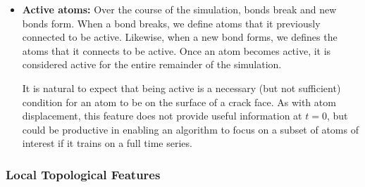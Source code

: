 \begin{itemize}
    \item \textbf{Active atoms:} Over the course of the simulation, bonds break and new bonds form.  When a bond breaks, we define atoms that it previously connected to be active.  Likewise, when a new bond forms, we defines the atoms that it connects to be active.  Once an atom becomes active, it is considered active for the entire remainder of the simulation.
    
    It is natural to expect that being active is a necessary (but not sufficient) condition for an atom to be on the surface of a crack face.  As with atom displacement, this feature does not provide useful information at $t=0$, but could be productive in enabling an algorithm to focus on a subset of atoms of interest if it trains on a full time series.

\end{itemize}

\subsubsection{Local Topological Features}

